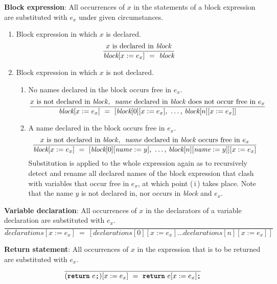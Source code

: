 \pagebreak
\textbf{Block expression}: All occurrences of $x$ in the statements of a block expression are substituted with $e_x$ under given circumstances.
\begin{enumerate}
    \item Block expression in which $x$ is declared.
    \[
    \frac{
      x \text{ is declared in \textit{block}}
    }{
      \textit{block}[x := e_x]
      \ = \ 
      \textit{block}
    }
    \]
    \item Block expression in which $x$ is not declared.
    \begin{enumerate}
        \item No names declared in the block occurs free in $e_x$.
        \[
        \frac{
           x \text{ is not declared in \textit{block}}\text{, } \ \textit{name} \text{ declared in \textit{block} does not occur free in } e_x
        }{
          \textit{block}[x := e_x]
          \ = \ 
          [\textit{block}[0][x := e_x] \text{, } \ldots \text{, } \textit{block}[n][x := e_x]]
        }
        \]
        \item A name declared in the block occurs free in $e_x$.
        \[
        \frac{
          x \text{ is not declared in \textit{block}}\text{, } \ \textit{name} \text{ declared in \textit{block} occurs free in } e_x
        }{
          \textit{block}[x := e_x]
          \ = \ 
          [\textit{block}[0][\textit{name} := y] \text{, } \ldots \text{, } \textit{block}[n][\textit{name} := y]][x := e_x]
        }
        \]
        Substitution is applied to the whole expression again as to recursively detect and rename all declared names of the block expression that clash with variables that occur free in $e_x$, at which point (\,i\,) takes place. Note that the name $y$ is not declared in, nor occurs in \textit{block} and $e_x$.
        \end{enumerate}
        \end{enumerate}

\vspace{10mm}
\textbf{Variable declaration}: All occurrences of $x$ in the declarators of a variable declaration are substituted with $e_x$.
\[
\frac{
}{
  \textit{declarations}[x := e_x]
  \ = \ 
  [\textit{declarations}[0][x := e_x] \ldots \textit{declarations}[n][x := e_x]]
}
\]

\vspace{10mm}
\textbf{Return statement}: All occurrences of $x$ in the expression that is to be returned are substituted with $e_x$.
\[
\frac{
}{
  (\textbf{\texttt{return}} \ e\textbf{\texttt{;}})[x := e_x]
  \ = \ 
  \textbf{\texttt{return}} \ e[x := e_x]\textbf{\texttt{;}}
}
\]

